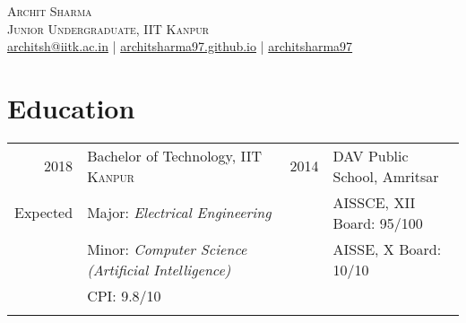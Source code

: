 \documentclass[a4paper,10pt]{article}
\begin{document}

\pagestyle{empty} %


\par{\centering
		{\hspace{-2mm}\Huge \textsc{Archit Sharma}
	}\\\large \textsc{Junior Undergraduate, IIT Kanpur}\\\normalsize \Letter\hspace{1mm}\href{mailto:architsh@iitk.ac.in}{architsh@iitk.ac.in} | \Mundus\hspace{1mm}\href{https://architsharma97.github.io/}{ architsharma97.github.io} | \faGithub \hspace{0mm} \href{https://github.com/architsharma97/}{architsharma97} \par}
	
\section{Education}
\begin{tabular}{rl|rl}	
\textsc{2018} & \large Bachelor of Technology, \textsc{IIT Kanpur} & \textsc{2014} & \large DAV Public School, Amritsar \\
Expected & {Major}: \textit{Electrical Engineering} & & AISSCE, XII Board: 95/100\\
         & {Minor}: \textit{Computer Science (Artificial Intelligence)}& & AISSE, X Board: 10/10\\ 
         & {CPI}: \textsc{9.8/10} \\
         & \\
\end{tabular}
\end{document}
